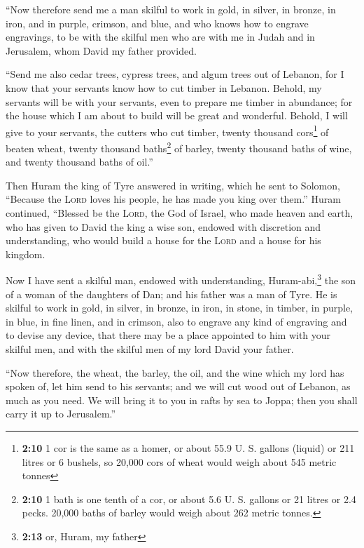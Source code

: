  ``Now therefore send me a man skilful to work in gold, in
silver, in bronze, in iron, and in purple, crimson, and blue, and who
knows how to engrave engravings, to be with the skilful men who are with
me in Judah and in Jerusalem, whom David my father provided.

 ``Send me also cedar trees, cypress trees, and algum
trees out of Lebanon, for I know that your servants know how to cut
timber in Lebanon. Behold, my servants will be with your servants,
 even to prepare me timber in abundance; for the house
which I am about to build will be great and wonderful. 
Behold, I will give to your servants, the cutters who cut timber, twenty
thousand cors\footnote{\textbf{2:10} 1 cor is the same as a homer, or
  about 55.9 U. S. gallons (liquid) or 211 litres or 6 bushels, so
  20,000 cors of wheat would weigh about 545 metric tonnes} of beaten
wheat, twenty thousand baths\footnote{\textbf{2:10} 1 bath is one tenth
  of a cor, or about 5.6 U. S. gallons or 21 litres or 2.4 pecks. 20,000
  baths of barley would weigh about 262 metric tonnes.} of barley,
twenty thousand baths of wine, and twenty thousand baths of oil.''

 Then Huram the king of Tyre answered in writing, which
he sent to Solomon, ``Because the \textsc{Lord} loves his people, he has
made you king over them.''  Huram continued, ``Blessed be
the \textsc{Lord}, the God of Israel, who made heaven and earth, who has
given to David the king a wise son, endowed with discretion and
understanding, who would build a house for the \textsc{Lord} and a house
for his kingdom.

 Now I have sent a skilful man, endowed with
understanding, Huram-abi,\footnote{\textbf{2:13} or, Huram, my father}
 the son of a woman of the daughters of Dan; and his
father was a man of Tyre. He is skilful to work in gold, in silver, in
bronze, in iron, in stone, in timber, in purple, in blue, in fine linen,
and in crimson, also to engrave any kind of engraving and to devise any
device, that there may be a place appointed to him with your skilful
men, and with the skilful men of my lord David your father.

 ``Now therefore, the wheat, the barley, the oil, and the
wine which my lord has spoken of, let him send to his servants;
 and we will cut wood out of Lebanon, as much as you
need. We will bring it to you in rafts by sea to Joppa; then you shall
carry it up to Jerusalem.''

